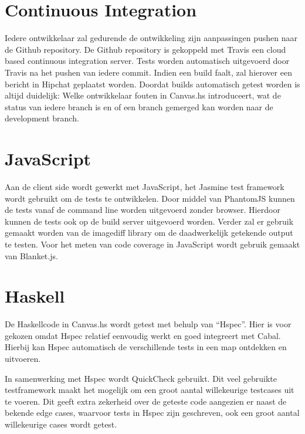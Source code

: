 \section{Continuous Integration}
Iedere ontwikkelaar zal gedurende de ontwikkeling zijn aanpassingen pushen naar de Github repository. De Github repository is gekoppeld met Travis een cloud based continuous integration server. Tests worden automatisch uitgevoerd door Travis na het pushen van iedere commit. Indien een build faalt, zal hierover een bericht in Hipchat geplaatst worden. Doordat builds automatisch getest worden is altijd duidelijk: Welke ontwikkelaar fouten in Canvas.hs introduceert, wat de status van iedere branch is en of een branch gemerged kan worden naar de development branch.

\section{JavaScript} 
Aan de client side wordt gewerkt met JavaScript, het Jasmine test framework wordt gebruikt om de tests te ontwikkelen. Door middel van PhantomJS kunnen de tests vanaf de command line worden uitgevoerd zonder browser. Hierdoor kunnen de tests ook op de build server uitgevoerd worden. Verder zal er gebruik gemaakt worden van de imagediff library om de daadwerkelijk getekende output te testen. Voor het meten van code coverage in JavaScript wordt gebruik gemaakt van Blanket.js.

\section{Haskell}
De Haskellcode in Canvas.hs wordt getest met behulp van ``Hspec''. Hier is voor gekozen omdat Hspec relatief eenvoudig werkt en goed integreert met Cabal. Hierbij kan Hspec automatisch de verschillende tests in een map ontdekken en uitvoeren.

In samenwerking met Hspec wordt QuickCheck gebruikt. Dit veel gebruikte testframework maakt het mogelijk om een groot aantal willekeurige testcases uit te voeren. Dit geeft extra zekerheid over de geteste code aangezien er naast de bekende edge cases, waarvoor tests in Hspec zijn geschreven, ook een groot aantal willekeurige cases wordt getest.